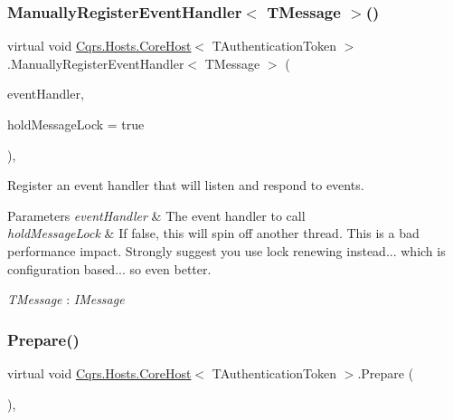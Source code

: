 \subsubsection{\texorpdfstring{Manually\+Register\+Event\+Handler$<$ T\+Message $>$()}{ManuallyRegisterEventHandler< TMessage >()}}
{\footnotesize\ttfamily virtual void \hyperlink{classCqrs_1_1Hosts_1_1CoreHost}{Cqrs.\+Hosts.\+Core\+Host}$<$ T\+Authentication\+Token $>$.Manually\+Register\+Event\+Handler$<$ T\+Message $>$ (\begin{DoxyParamCaption}\item[{Action$<$ T\+Message $>$}]{event\+Handler,  }\item[{bool}]{hold\+Message\+Lock = {\ttfamily true} }\end{DoxyParamCaption})\hspace{0.3cm}{\ttfamily [protected]}, {\ttfamily [virtual]}}



Register an event handler that will listen and respond to events. 


\begin{DoxyParams}{Parameters}
{\em event\+Handler} & The event handler to call\\
\hline
{\em hold\+Message\+Lock} & If false, this will spin off another thread. This is a bad performance impact. Strongly suggest you use lock renewing instead... which is configuration based... so even better.\\
\hline
\end{DoxyParams}
\begin{Desc}
\item[Type Constraints]\begin{description}
\item[{\em T\+Message} : {\em I\+Message}]\end{description}
\end{Desc}
\mbox{\label{classCqrs_1_1Hosts_1_1CoreHost_aa01932c1199967babe19c3059e86f513_aa01932c1199967babe19c3059e86f513}} 
\subsubsection{\texorpdfstring{Prepare()}{Prepare()}}
{\footnotesize\ttfamily virtual void \hyperlink{classCqrs_1_1Hosts_1_1CoreHost}{Cqrs.\+Hosts.\+Core\+Host}$<$ T\+Authentication\+Token $>$.Prepare (\begin{DoxyParamCaption}{ }\end{DoxyParamCaption})\hspace{0.3cm}{\ttfamily [protected]}, {\ttfamily [virtual]}}



